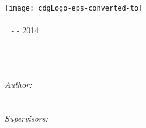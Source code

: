 
\begin{titlepage}

\begin{center}


\texttt{[image: cdgLogo-eps-converted-to]}\\[1cm]    

\textsc{\LARGE \myDepartment}\\[1.5cm]


\textsc{\Large \myTitle ~ -   - 2014}\\[0.5cm]


\HRule \\[0.4cm]
{ \huge \bfseries \myPhd}\\[0.4cm]

\HRule \\[1.5cm]


\begin{minipage}{0.8\textwidth}
\begin{center} \large

\emph{Author:}\\[0.4cm]

\myName \\
\texttt{\myemail}\\[1.5cm]

\emph{Supervisors:} \\[0.4cm]

\myProf \\[0.2cm]
\myOtherProf \\ [0.2cm]
\myOtherProff

\end{center}

\end{minipage}

\vfill

{\large \myTime}

\end{center}

\end{titlepage}
